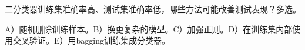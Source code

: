 二分类器训练集准确率高、测试集准确率低，哪些方法可能改善测试表现？多选。


A）随机删除训练样本。B）换更复杂的模型。C）加强正则。D）在训练集内部使用交叉验证。E）用bagging训练集成分类器。
